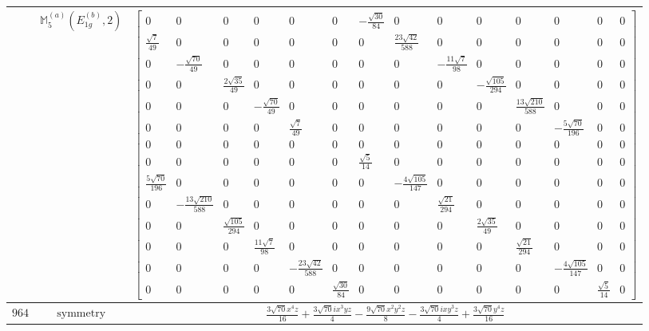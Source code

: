 \documentclass[fleqn,8pt,landscape]{jsarticle}
\begin{document}
\begin{longtable}{ccc}
$  $ & $ \mathbb{M}_{5}^{(a)}(E_{1g}^{(b)},2) $ & $ \begin{bmatrix} 0 & 0 & 0 & 0 & 0 & 0 & - \frac{\sqrt{30}}{84} & 0 & 0 & 0 & 0 & 0 & 0 & 0 \\ \frac{\sqrt{7}}{49} & 0 & 0 & 0 & 0 & 0 & 0 & \frac{23 \sqrt{42}}{588} & 0 & 0 & 0 & 0 & 0 & 0 \\ 0 & - \frac{\sqrt{70}}{49} & 0 & 0 & 0 & 0 & 0 & 0 & - \frac{11 \sqrt{7}}{98} & 0 & 0 & 0 & 0 & 0 \\ 0 & 0 & \frac{2 \sqrt{35}}{49} & 0 & 0 & 0 & 0 & 0 & 0 & - \frac{\sqrt{105}}{294} & 0 & 0 & 0 & 0 \\ 0 & 0 & 0 & - \frac{\sqrt{70}}{49} & 0 & 0 & 0 & 0 & 0 & 0 & \frac{13 \sqrt{210}}{588} & 0 & 0 & 0 \\ 0 & 0 & 0 & 0 & \frac{\sqrt{7}}{49} & 0 & 0 & 0 & 0 & 0 & 0 & - \frac{5 \sqrt{70}}{196} & 0 & 0 \\ 0 & 0 & 0 & 0 & 0 & 0 & 0 & 0 & 0 & 0 & 0 & 0 & 0 & 0 \\ 0 & 0 & 0 & 0 & 0 & 0 & \frac{\sqrt{5}}{14} & 0 & 0 & 0 & 0 & 0 & 0 & 0 \\ \frac{5 \sqrt{70}}{196} & 0 & 0 & 0 & 0 & 0 & 0 & - \frac{4 \sqrt{105}}{147} & 0 & 0 & 0 & 0 & 0 & 0 \\ 0 & - \frac{13 \sqrt{210}}{588} & 0 & 0 & 0 & 0 & 0 & 0 & \frac{\sqrt{21}}{294} & 0 & 0 & 0 & 0 & 0 \\ 0 & 0 & \frac{\sqrt{105}}{294} & 0 & 0 & 0 & 0 & 0 & 0 & \frac{2 \sqrt{35}}{49} & 0 & 0 & 0 & 0 \\ 0 & 0 & 0 & \frac{11 \sqrt{7}}{98} & 0 & 0 & 0 & 0 & 0 & 0 & \frac{\sqrt{21}}{294} & 0 & 0 & 0 \\ 0 & 0 & 0 & 0 & - \frac{23 \sqrt{42}}{588} & 0 & 0 & 0 & 0 & 0 & 0 & - \frac{4 \sqrt{105}}{147} & 0 & 0 \\ 0 & 0 & 0 & 0 & 0 & \frac{\sqrt{30}}{84} & 0 & 0 & 0 & 0 & 0 & 0 & \frac{\sqrt{5}}{14} & 0 \end{bmatrix} $ \\ \hline
$ 964 $ & $ \text{symmetry} $ & $ \frac{3 \sqrt{70} x^{4} z}{16} + \frac{3 \sqrt{70} i x^{3} y z}{4} - \frac{9 \sqrt{70} x^{2} y^{2} z}{8} - \frac{3 \sqrt{70} i x y^{3} z}{4} + \frac{3 \sqrt{70} y^{4} z}{16} $ \\

\end{longtable}
\end{document}

